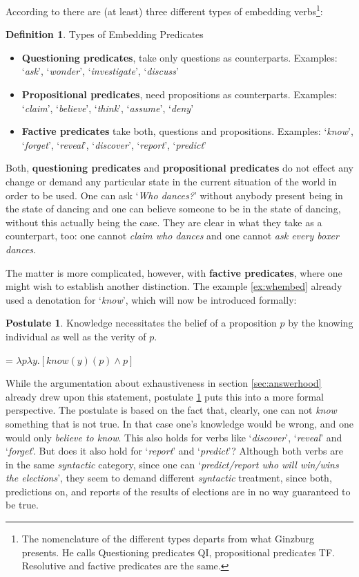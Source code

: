 \documentclass[a4paper]{article}
\newcommand{\term}[1]{\textsf{\textbf{#1}}} %
\newcommand{\example}[1]{`\textit{#1}'} %
\theoremstyle{remark}
\theoremstyle{remark}
\theoremstyle{definition}
\newtheorem{definition}[thm]{Definition}
\theoremstyle{definition}
\newtheorem{postulate}[thm]{Postulate}
\begin{document}
According to \cite{ginzburg} there are (at least) three different types of
embedding verbs\footnote{The nomenclature of the different types departs from
what Ginzburg presents. He calls Questioning predicates QI, propositional
predicates TF. Resolutive and factive predicates are the same.}:

\begin{definition}\label{def:embed1}
  Types of Embedding Predicates
\begin{itemize}
  \item \term{Questioning predicates}, take only questions as counterparts.
  Examples: \example{ask}, \example{wonder}, \example{investigate},
  \example{discuss}
  \item \term{Propositional predicates}, need propositions as counterparts.
  Examples: \example{claim}, \example{believe}, \example{think},
  \example{assume}, \example{deny}
  \item \term{Factive predicates} take both, questions and propositions.
  Examples:
  \example{know}, \example{forget}, \example{reveal}, \example{discover},
  \example{report}, \example{predict}
\end{itemize}
\end{definition}

Both, \term{questioning predicates} and \term{propositional predicates} do not
effect any change or demand any particular state in the current situation of the
world in order to be used. One can ask \example{Who dances?} without anybody
present being in the state of dancing and one can believe someone to be in the
state of dancing, without this actually being the case. They are clear in what
they take as a counterpart, too: one cannot \emph{claim who dances} and one
cannot \emph{ask every boxer dances}.

The matter is more complicated, however, with \term{factive predicates}, where
one might wish to establish another distinction. The example
\ref{ex:whembed} already used a denotation for \example{know}, which will now be
introduced formally:

\begin{postulate}\label{def:know}
  Knowledge necessitates the belief of a proposition $p$ by the knowing
  individual as well as the verity of $p$.

   = $\lambda p\lambda y.[know(y)(p)\wedge p]$
\end{postulate}

While the argumentation about exhaustiveness in section \ref{sec:answerhood}
already drew upon this statement, postulate \ref{def:know} puts this into a
more formal perspective. The postulate is based on the fact that, clearly, one
can not \emph{know} something that is not true. In that case one's knowledge
would be wrong, and one would only \emph{believe to know}. This also holds for
verbs like \example{discover}, \example{reveal} and \example{forget}. But does
it also hold for \example{report} and \example{predict}? Although both verbs are
in the same \emph{syntactic} category, since one can \example{predict/report who will
win/wins the elections}, they seem to demand different \emph{syntactic}
treatment, since both, predictions on, and reports of the results of elections are
in no way guaranteed to be true.
\end{document}
